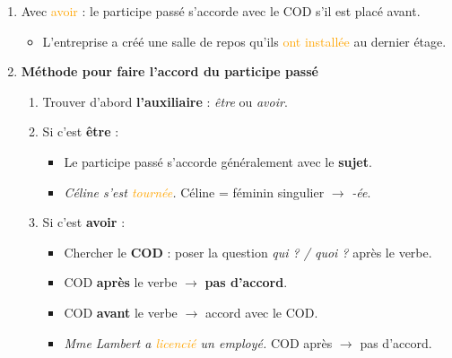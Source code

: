 \documentclass[math,code]{amznotes}
\theoremstyle{remark}
\begin{document}
\begin{enumerate}
\begin{notebox}
        Les \textbf{verbes pronominaux} utilisent aussi toujours \textbf{être} :
        \textit{se lever, se tourner, s'endormir, s'inscrire, \dots}
        
        \textbf{Attention :} certains de ces verbes peuvent utiliser \textbf{avoir}
        quand ils ont un COD : \textit{Elle est sortie.} mais
        \textit{Elle a sorti la voiture.}
    \end{notebox}


    \item Avec \textcolor{orange}{avoir} : le participe passé s'accorde avec le COD s'il est placé avant.
    \begin{itemize}
        \item L'entreprise a créé une salle de repos qu'ils \textcolor{orange}{ont installée} au dernier étage.
    \end{itemize} 

    \item \textbf{Méthode pour faire l'accord du participe passé}
    \begin{enumerate}
        \item Trouver d'abord \textbf{l'auxiliaire} : \textit{être} ou \textit{avoir}.
        
        \item Si c'est \textbf{être} :
        \begin{itemize}
            \item Le participe passé s'accorde généralement avec le \textbf{sujet}.
            \item \textit{Céline s'est \textcolor{orange}{tournée}.}
            \quad Céline = féminin singulier $\rightarrow$ \textit{-ée}.
        \end{itemize}
        
        \item Si c'est \textbf{avoir} :
        \begin{itemize}
            \item Chercher le \textbf{COD} : poser la question
            \textit{qui ? / quoi ?} après le verbe.
            \item COD \textbf{après} le verbe $\rightarrow$ \textbf{pas d'accord}.
            \item COD \textbf{avant} le verbe $\rightarrow$ accord avec le COD.
        \end{itemize}
        
        \begin{itemize}
            \item \textit{Mme Lambert a \textcolor{orange}{licencié} un employé.}
            \quad COD après $\rightarrow$ pas d'accord.
            

\end{itemize}
\end{enumerate}
\end{enumerate}
\end{document}
